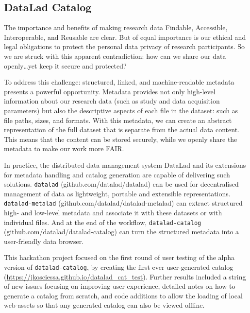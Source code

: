 \documentclass[../main.tex]{subfiles}
\begin{document}
\subsection{DataLad Catalog}\label{sec:DLC}


The importance and benefits of making research data Findable, Accessible, Interoperable, and Reusable are clear\supercite{Wilkinson2016}. But of equal importance is our ethical and legal obligations to protect the personal data privacy of research participants. So we are struck with this apparent contradiction: how can we share our data openly…yet keep it secure and protected?

To address this challenge: structured, linked, and machine-readable metadata presents a powerful opportunity. Metadata provides not only high-level information about our research data (such as study and data acquisition parameters) but also the descriptive aspects of each file in the dataset: such as file paths, sizes, and formats. With this metadata, we can create an abstract representation of the full dataset that is separate from the actual data content. This means that the content can be stored securely, while we openly share the metadata to make our work more FAIR.

In practice, the distributed data management system DataLad\supercite{Halchenko2021} and its extensions for metadata handling and catalog generation are capable of delivering such solutions. \texttt{datalad} (github.com/datalad/datalad) can be used for decentralised management of data as lightweight, portable and extensible representations. \texttt{datalad-metalad} (github.com/datalad/datalad-metalad) can extract structured high- and low-level metadata and associate it with these datasets or with individual files. And at the end of the workflow, \texttt{datalad-catalog} (\url{github.com/datalad/datalad-catalog}) can turn the structured metadata into a user-friendly data browser.

This hackathon project focused on the first round of user testing of the alpha version of \texttt{datalad-catalog}, by creating the first ever user-generated catalog (\url{https://jkosciessa.github.io/datalad_cat_test}). Further results included a string of new issues focusing on improving user experience, detailed notes on how to generate a catalog from scratch, and code additions to allow the loading of local web-assets so that any generated catalog can also be viewed offline.
\end{document}
